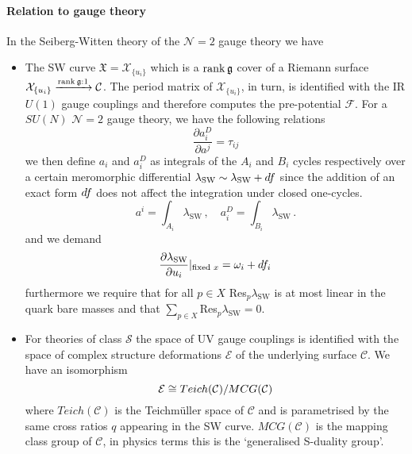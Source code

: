 \documentclass[main.tex]{subfiles}
\begin{document}
\paragraph{Relation to gauge theory} 
In the Seiberg-Witten theory of the $\mathcal{N}=2$ gauge theory we have
\begin{itemize}
\item{The SW curve $\mathfrak{X}=\mathcal{X}_{\{u_i\}}$ which is a $\operatorname{rank} \mathfrak{g}$ cover of a Riemann surface $\mathcal{X}_{\{u_i\}}\xrightarrow[]{\operatorname{rank} \mathfrak{g}:1}\mathcal{C}$. The period matrix of $\mathcal{X}_{\{u_i\}}$, in turn, is identified with the IR $U(1)$ gauge couplings and therefore computes the pre-potential $\mathcal{F}$. For a $SU(N)$ $\mathcal{N}=2$ gauge theory, we have the following relations
\begin{equation}
\frac{\partial a^D_i}{\partial a^j}=\tau_{ij}
\end{equation}
we then define $a_i$ and $a^D_i$ as integrals of the $A_i$ and $B_i$ cycles respectively over a certain meromorphic differential $\lambda_{\text{SW}}\sim\lambda_{\text{SW}}+d f$ since the addition of an exact form $d f$ does not affect the integration under closed one-cycles.
\begin{equation}
a^i=\int_{A_i}\lambda_{\text{SW}}\,,\quad a^D_i=\int_{B_i}\lambda_{\text{SW}}\,.
\end{equation}
and we demand
\begin{equation}\label{eqn:taudetsw}
\frac{\partial\lambda_{\text{SW}}}{\partial u_i}|_{\text{fixed $x$}}=\omega_i+d f_i
\end{equation}
furthermore we require that for all $p\in X$ Res$_{p}\lambda_{\text{SW}}$ is at most linear in the quark bare masses and that $\sum_{p\in X}$Res$_p\lambda_{\text{SW}}=0$.}
\item{For theories of class $\mathcal{S}$ the space of UV gauge couplings is identified with the space of complex structure deformations $\mathcal{E}$ of the underlying surface $\mathcal{C}$. We have an isomorphism 
\begin{equation}
\mathcal{E}\cong Teich(\mathcal{C})/ MCG(\mathcal{C})
\end{equation}
where $Teich(\mathcal{C})$ is the Teichm\"uller space of $\mathcal{C}$ and is parametrised by the same cross ratios $q$ appearing in the SW curve. $MCG(\mathcal{C})$ is the mapping class group of $\mathcal{C}$, in physics terms this is the `generalised S-duality group'.}
\end{itemize} 
\end{document}
